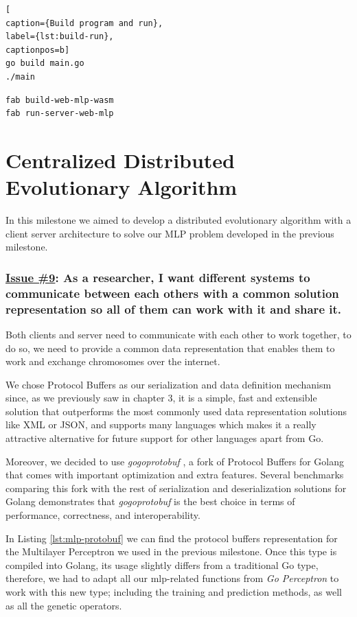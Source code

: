 \begin{lstlisting}[
caption={Build program and run},
label={lst:build-run},
captionpos=b]
go build main.go
./main
\end{lstlisting} 

\begin{lstlisting}[language=bash, label={lst:run-web},
captionpos=b, caption={Build and serve webpage}]
fab build-web-mlp-wasm
fab run-server-web-mlp
\end{lstlisting}


\section{Centralized Distributed Evolutionary Algorithm}

In this milestone we aimed to develop a distributed evolutionary algorithm with a client server architecture to solve our MLP problem developed in the previous milestone.

\subsubsection*{\href{https://github.com/salvacorts/TFG-Parasitic-Metaheuristics/issues/9}{Issue \#9}: As a researcher, I want different systems to communicate between each others with a common solution representation so all of them can work with it and share it.}

Both clients and server need to communicate with each other to work together, to do so, we need to provide a common data representation that enables them to work and exchange chromosomes over the internet. 

We chose Protocol Buffers as our serialization and data definition mechanism since, as we previously saw in chapter 3, it is a simple, fast and extensible solution that outperforms the most commonly used data representation solutions like XML or JSON, and supports many languages which makes it a really attractive alternative for future support for other languages apart from Go.

Moreover, we decided to use \textit{gogoprotobuf} \cite{gogo}, a fork of Protocol Buffers for Golang that comes with important optimization and extra features. Several benchmarks \cite{gogo-bench} comparing this fork with the rest of serialization and deserialization solutions for Golang demonstrates that \textit{gogoprotobuf} is the best choice in terms of performance, correctness, and interoperability.

In Listing \ref{lst:mlp-protobuf} we can find the protocol buffers representation for the Multilayer Perceptron we used in the previous milestone. Once this type is compiled into Golang, its usage slightly differs from a traditional Go type, therefore, we had to adapt all our mlp-related functions from \textit{Go Perceptron} to work with this new type; including the training and prediction methods, as well as all the genetic operators.

